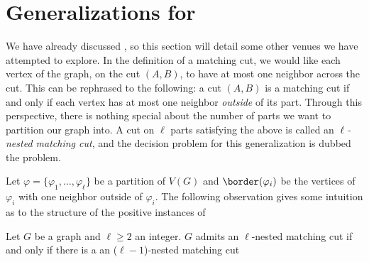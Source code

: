 \section{Generalizations for }

We have already discussed , so this section will detail some other venues we have attempted to explore.
In the definition of a matching cut, we would like each vertex of the graph, on the cut $(A,B)$, to have at most one neighbor across the cut.
This can be rephrased to the following: a cut $(A,B)$ is a matching cut if and only if each vertex has at most one neighbor \textit{outside} of its part.
Through this perspective, there is nothing special about the number of parts we want to partition our graph into.
A cut on $\ell$ parts satisfying the above is called an \textit{$\ell$-nested matching cut}, and the decision problem for this generalization is dubbed the  problem.


Let $\varphi = \{\varphi_1, \dots, \varphi_\ell\}$ be a partition of $V(G)$ and $\border(\varphi_i)$ be the vertices of $\varphi_i$ with one neighbor outside of $\varphi_i$.
The following observation gives some intuition as to the structure of the positive instances of 

\begin{observation}
    Let $G$ be a graph and $\ell \geq 2$ an integer.
    $G$ admits an $\ell$-nested matching cut if and only if there is a an ($\ell-1$)-nested matching cut
\end{observation}